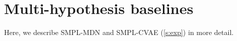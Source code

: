 

\section{Multi-hypothesis baselines} \label{s:supp_baselines}

Here, we describe SMPL-MDN and SMPL-CVAE (\cref{s:exp}) in more detail.

